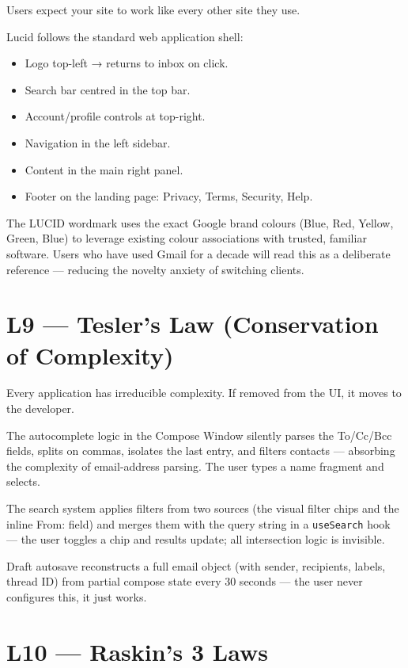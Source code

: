 \documentclass[12pt,a4paper]{report}
\begin{document}
Users expect your site to work like every other site they use.

Lucid follows the standard web application shell:
\begin{itemize}[leftmargin=*, itemsep=2pt]
  \item Logo top-left → returns to inbox on click.
  \item Search bar centred in the top bar.
  \item Account/profile controls at top-right.
  \item Navigation in the left sidebar.
  \item Content in the main right panel.
  \item Footer on the landing page: Privacy, Terms, Security, Help.
\end{itemize}

The LUCID wordmark uses the exact Google brand colours (Blue, Red, Yellow, Green, Blue)
to leverage existing colour associations with trusted, familiar software. Users who have
used Gmail for a decade will read this as a deliberate reference — reducing the novelty
anxiety of switching clients.


\section{L9 — Tesler's Law (Conservation of Complexity)}

Every application has irreducible complexity. If removed from the UI, it moves to the developer.

The autocomplete logic in the Compose Window silently parses the To/Cc/Bcc fields, splits
on commas, isolates the last entry, and filters contacts — absorbing the complexity of
email-address parsing. The user types a name fragment and selects.

The search system applies filters from two sources (the visual filter chips and the inline
From: field) and merges them with the query string in a \texttt{useSearch} hook — the user
toggles a chip and results update; all intersection logic is invisible.

Draft autosave reconstructs a full email object (with sender, recipients, labels, thread ID)
from partial compose state every 30 seconds — the user never configures this, it just works.

\section{L10 — Raskin's 3 Laws}
\end{document}
